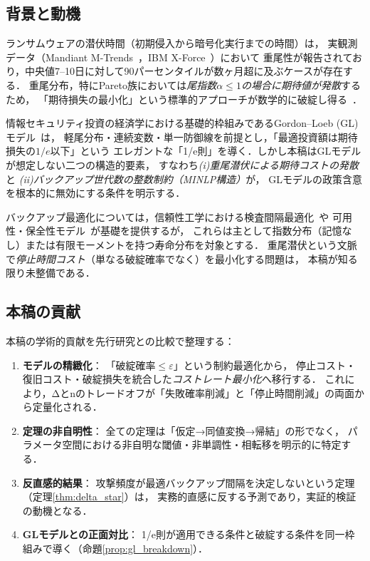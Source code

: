 \documentclass[12pt,a4paper]{article}
\theoremstyle{plain}
\theoremstyle{definition}
\theoremstyle{remark}
\begin{document}
\subsection{背景と動機}

ランサムウェアの潜伏時間（初期侵入から暗号化実行までの時間）は，
実観測データ（Mandiant M-Trends~\cite{mandiant2023}，IBM X-Force~\cite{ibm2023}）において
重尾性が報告されており，中央値7--10日に対して90パーセンタイルが数ヶ月超に及ぶケースが存在する．
重尾分布，特にPareto族においては\emph{尾指数$\alpha\le1$の場合に期待値が発散}するため，
「期待損失の最小化」という標準的アプローチが数学的に破綻し得る~\cite{embrechts1997}．

情報セキュリティ投資の経済学における基礎的枠組みであるGordon--Loeb (GL) モデル~\cite{gordon2002}は，
軽尾分布・連続変数・単一防御線を前提とし，「最適投資額は期待損失の$1/e$以下」という
エレガントな「1/e則」を導く．しかし本稿はGLモデルが想定しない二つの構造的要素，
すなわち\emph{(i)重尾潜伏による期待コストの発散}と
\emph{(ii)バックアップ世代数の整数制約（MINLP構造）}が，
GLモデルの政策含意を根本的に無効にする条件を明示する．

バックアップ最適化については，信頼性工学における検査間隔最適化~\cite{barlow1965,nakagawa2005}や
可用性・保全性モデル~\cite{birolini2017}が基礎を提供するが，
これらは主として指数分布（記憶なし）または有限モーメントを持つ寿命分布を対象とする．
重尾潜伏という文脈で\emph{停止時間コスト}（単なる破綻確率でなく）を最小化する問題は，
本稿が知る限り未整備である．

\subsection{本稿の貢献}

本稿の学術的貢献を先行研究との比較で整理する：
\begin{enumerate}
\item \textbf{モデルの精緻化}：
  「破綻確率$\le\varepsilon$」という制約最適化から，
  停止コスト・復旧コスト・破綻損失を統合した\emph{コストレート最小化}へ移行する．
  これにより，Δとnのトレードオフが「失敗確率削減」と「停止時間削減」の両面から定量化される．
\item \textbf{定理の非自明性}：
  全ての定理は「仮定→同値変換→帰結」の形でなく，
  パラメータ空間における非自明な閾値・非単調性・相転移を明示的に特定する．
\item \textbf{反直感的結果}：
  攻撃頻度が最適バックアップ間隔を決定しないという定理（定理\ref{thm:delta_star}）は，
  実務的直感に反する予測であり，実証的検証の動機となる．
\item \textbf{GLモデルとの正面対比}：
  1/e則が適用できる条件と破綻する条件を同一枠組みで導く（命題\ref{prop:gl_breakdown}）．
\end{enumerate}
\end{document}
